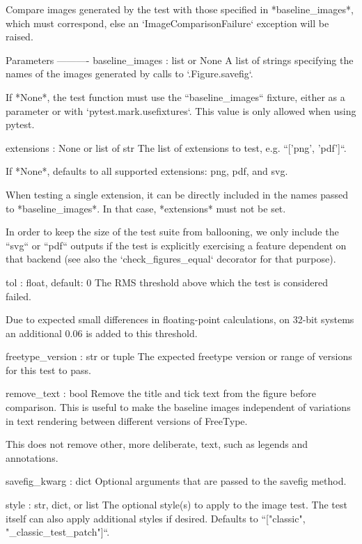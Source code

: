 \begin{DoxyVerb}Compare images generated by the test with those specified in
*baseline_images*, which must correspond, else an `ImageComparisonFailure`
exception will be raised.

Parameters
----------
baseline_images : list or None
    A list of strings specifying the names of the images generated by
    calls to `.Figure.savefig`.

    If *None*, the test function must use the ``baseline_images`` fixture,
    either as a parameter or with `pytest.mark.usefixtures`. This value is
    only allowed when using pytest.

extensions : None or list of str
    The list of extensions to test, e.g. ``['png', 'pdf']``.

    If *None*, defaults to all supported extensions: png, pdf, and svg.

    When testing a single extension, it can be directly included in the
    names passed to *baseline_images*.  In that case, *extensions* must not
    be set.

    In order to keep the size of the test suite from ballooning, we only
    include the ``svg`` or ``pdf`` outputs if the test is explicitly
    exercising a feature dependent on that backend (see also the
    `check_figures_equal` decorator for that purpose).

tol : float, default: 0
    The RMS threshold above which the test is considered failed.

    Due to expected small differences in floating-point calculations, on
    32-bit systems an additional 0.06 is added to this threshold.

freetype_version : str or tuple
    The expected freetype version or range of versions for this test to
    pass.

remove_text : bool
    Remove the title and tick text from the figure before comparison.  This
    is useful to make the baseline images independent of variations in text
    rendering between different versions of FreeType.

    This does not remove other, more deliberate, text, such as legends and
    annotations.

savefig_kwarg : dict
    Optional arguments that are passed to the savefig method.

style : str, dict, or list
    The optional style(s) to apply to the image test. The test itself
    can also apply additional styles if desired. Defaults to ``["classic",
    "_classic_test_patch"]``.
\end{DoxyVerb}
 \mbox{\label{namespacematplotlib_1_1testing_1_1decorators_afcf7b690a5627c0a0a23b0b5733fb496}} 
